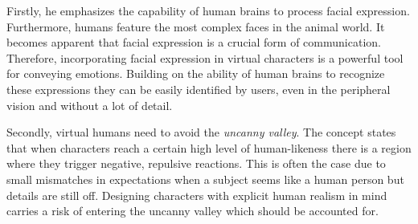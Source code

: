 Firstly, he emphasizes the capability of human brains to process facial expression.
Furthermore, humans feature the most complex faces in the animal world.
It becomes apparent that facial expression is a crucial form of communication.
Therefore, incorporating facial expression in virtual characters is a powerful tool for conveying emotions.
Building on the ability of human brains to recognize these expressions they can be easily identified by users, even in the peripheral vision and without a lot of detail.

Secondly, virtual humans need to avoid the \emph{uncanny valley}.
The concept states that when characters reach a certain high level of human-likeness there is a region where they trigger negative, repulsive reactions.
This is often the case due to small mismatches in expectations when a subject seems like a human person but details are still off.
Designing characters with explicit human realism in mind carries a risk of entering the uncanny valley which should be accounted for.